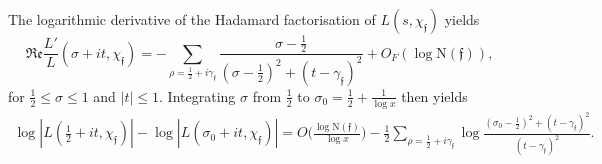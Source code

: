 \documentclass[11pt]{amsart}
\newcommand{\norm}{\mathrm{N}}
\newcommand{\oh}{\mbox{$\frac{1}{2}$}}
\numberwithin{equation}{section}
\renewcommand{\Re}{{\mathfrak{Re}}}
\theoremstyle{remark}
\begin{document}
The logarithmic derivative of the Hadamard factorisation of $L(s,\chi_\mathfrak{f})$ yields
\begin{equation}\label{hada}
\Re \frac{L'}{L}(\sigma +it,\chi_\mathfrak{f})
 =  -
\sum_{\rho =\frac{1}{2} +i\gamma_\mathfrak{f}}  \frac{\sigma- \frac{1}{2} }{(\sigma -\frac{1}{2})^2+ (t-\gamma_\mathfrak{f})^2} +O_{F}(\log \norm( \mathfrak{f})),
\end{equation}
for $\frac{1}{2}\le\sigma\le 1$ and $|t|\le 1$. Integrating $\sigma$ from $\frac{1}{2}$ to $\sigma_0 =\frac{1}{2}+\frac{1}{\log x}$ then yields
\begin{align*}
\log |L(\oh +it,\chi_\mathfrak{f})| -\log |L(\sigma_0 +it, \chi_\mathfrak{f})|= O\Big(\frac{\log \norm( \mathfrak{f})}{\log x}\Big)   
-\frac{1}{2}\sum_{\rho =\frac{1}{2} +i\gamma_\mathfrak{f}} \log \frac{ (\sigma_0 -\frac{1}{2})^2 +(t-\gamma_\mathfrak{f})^2  }{ (t-\gamma_\mathfrak{f})^2}.
\end{align*}
\end{document}

